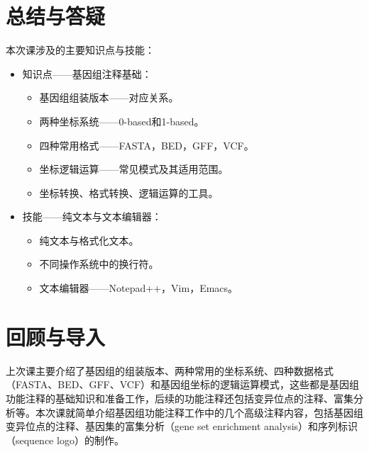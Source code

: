 \documentclass[11pt,a4paper,twoside]{book}
\begin{document}
\section{总结与答疑}
本次课涉及的主要知识点与技能：
\begin{itemize}
  \item 知识点——基因组注释基础：
    \begin{itemize}
      \item 基因组组装版本——对应关系。
      \item 两种坐标系统——0-based和1-based。
      \item 四种常用格式——FASTA，BED，GFF，VCF。
      \item 坐标逻辑运算——常见模式及其适用范围。
      \item 坐标转换、格式转换、逻辑运算的工具。
    \end{itemize}
  \item 技能——纯文本与文本编辑器：
    \begin{itemize}
      \item 纯文本与格式化文本。
      \item 不同操作系统中的换行符。
      \item 文本编辑器——Notepad++，Vim，Emacs。
    \end{itemize}
\end{itemize}

\section{回顾与导入}
上次课主要介绍了基因组的组装版本、两种常用的坐标系统、四种数据格式（FASTA、BED、GFF、VCF）和基因组坐标的逻辑运算模式，这些都是基因组功能注释的基础知识和准备工作，后续的功能注释还包括变异位点的注释、富集分析等。本次课就简单介绍基因组功能注释工作中的几个高级注释内容，包括基因组变异位点的注释、基因集的富集分析（gene set enrichment analysis）和序列标识（sequence logo）的制作。
\end{document}
